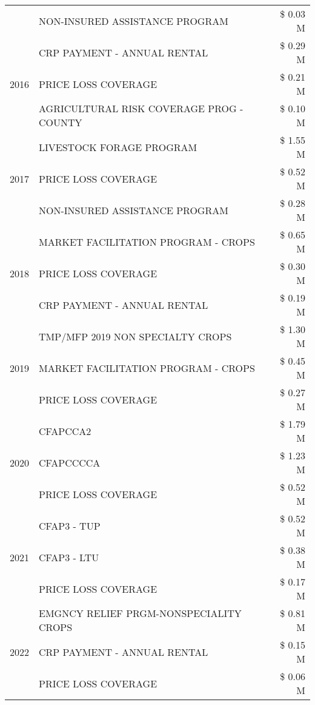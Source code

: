 \begin{tabular}{llr}
 & NON-INSURED ASSISTANCE PROGRAM & \$ 0.03 M \\
\cline{1-3}
\multirow[t]{3}{*}{2016} & CRP PAYMENT - ANNUAL RENTAL & \$ 0.29 M \\
 & PRICE LOSS COVERAGE & \$ 0.21 M \\
 & AGRICULTURAL RISK COVERAGE PROG - COUNTY & \$ 0.10 M \\
\cline{1-3}
\multirow[t]{3}{*}{2017} & LIVESTOCK FORAGE PROGRAM & \$ 1.55 M \\
 & PRICE LOSS COVERAGE & \$ 0.52 M \\
 & NON-INSURED ASSISTANCE PROGRAM & \$ 0.28 M \\
\cline{1-3}
\multirow[t]{3}{*}{2018} & MARKET FACILITATION PROGRAM - CROPS & \$ 0.65 M \\
 & PRICE LOSS COVERAGE & \$ 0.30 M \\
 & CRP PAYMENT - ANNUAL RENTAL & \$ 0.19 M \\
\cline{1-3}
\multirow[t]{3}{*}{2019} & TMP/MFP 2019 NON SPECIALTY CROPS & \$ 1.30 M \\
 & MARKET FACILITATION PROGRAM - CROPS & \$ 0.45 M \\
 & PRICE LOSS COVERAGE & \$ 0.27 M \\
\cline{1-3}
\multirow[t]{3}{*}{2020} & CFAPCCA2 & \$ 1.79 M \\
 & CFAPCCCCA & \$ 1.23 M \\
 & PRICE LOSS COVERAGE & \$ 0.52 M \\
\cline{1-3}
\multirow[t]{3}{*}{2021} & CFAP3 - TUP & \$ 0.52 M \\
 & CFAP3 - LTU & \$ 0.38 M \\
 & PRICE LOSS COVERAGE & \$ 0.17 M \\
\cline{1-3}
\multirow[t]{3}{*}{2022} & EMGNCY RELIEF PRGM-NONSPECIALITY CROPS & \$ 0.81 M \\
 & CRP PAYMENT - ANNUAL RENTAL & \$ 0.15 M \\
 & PRICE LOSS COVERAGE & \$ 0.06 M \\
\cline{1-3}
\bottomrule
\end{tabular}
